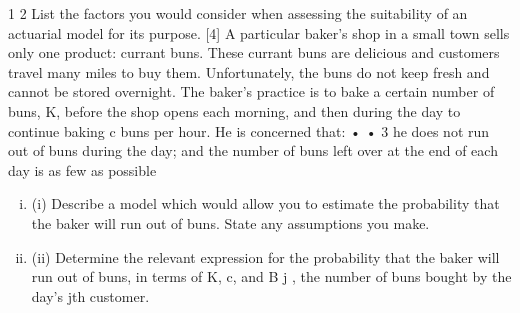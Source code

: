 \documentclass[a4paper,12pt]{article}
\begin{document}
\begin{enumerate}
1
2
List the factors you would consider when assessing the suitability of an actuarial
model for its purpose.
[4]
A particular baker’s shop in a small town sells only one product: currant buns. These
currant buns are delicious and customers travel many miles to buy them.
Unfortunately, the buns do not keep fresh and cannot be stored overnight.
The baker’s practice is to bake a certain number of buns, K, before the shop opens
each morning, and then during the day to continue baking c buns per hour. He is
concerned that:
•
•
3
he does not run out of buns during the day; and
the number of buns left over at the end of each day is as few as possible
\begin{enumerate}[(i)]
\item (i) Describe a model which would allow you to estimate the probability that the baker will run out of buns. State any assumptions you make.
\item 
(ii) Determine the relevant expression for the probability that the baker will run out of buns, in terms of K, c, and B j , the number of buns bought by the day’s jth customer.
\end{enumerate}


\end{enumerate}
\end{document}
